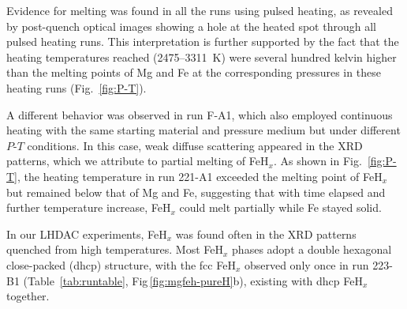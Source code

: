 \documentclass[draft,jgrga,12pt]{agujournal2019}
\begin{document}

Evidence for melting was found in all the runs using pulsed heating, as revealed by post-quench optical images showing a hole at the heated spot through all pulsed heating runs. This interpretation is further supported by the fact that the heating temperatures reached (2475--3311~K) were several hundred kelvin higher than the melting points of Mg and Fe at the corresponding pressures in these heating runs (Fig.~\ref{fig:P-T}). 

A different behavior was observed in run F-A1, which also employed continuous heating with the same starting material and pressure medium but under different $P$-$T$ conditions. 
In this case, weak diffuse scattering appeared in the XRD patterns, which we attribute to partial melting of FeH$_x$. 
As shown in Fig.~\ref{fig:P-T}, the heating temperature in run 221-A1 exceeded the melting point of FeH$_x$ but remained below that of Mg and Fe, suggesting that with time elapsed and further temperature increase, FeH$_x$ could melt partially while Fe stayed solid.



In our LHDAC experiments, FeH$_x$ was {found often} in the XRD patterns quenched from high temperatures.
Most FeH$_x$ phases adopt a double hexagonal close-packed (dhcp) structure, with the fcc FeH$_x$ observed only once in run 223-B1 (Table~\ref{tab:runtable}, Fig\,\ref{fig:mgfeh-pureH}b), existing with dhcp FeH$_x$ together. 
\end{document}
